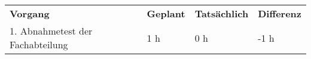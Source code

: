 \begin{tabular}{llll}
\rowcolor{heading}\textbf{Vorgang} & \textbf{Geplant} & \textbf{Tatsächlich} & \textbf{Differenz} \\
1. Abnahmetest der Fachabteilung & 1 h   & 0 h   & -1 h \\
\end{tabular}
